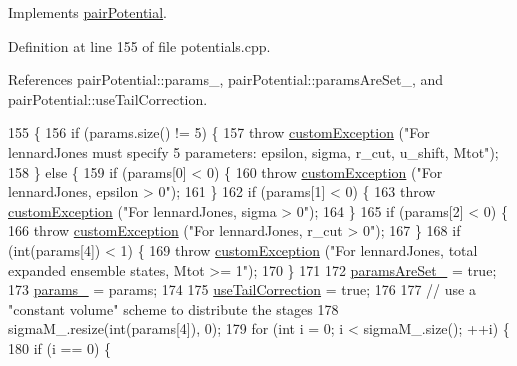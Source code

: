 Implements \hyperlink{classpair_potential_ad4b237646f9de2ae9f95cc9350564bc5}{pair\-Potential}.



Definition at line 155 of file potentials.\-cpp.



References pair\-Potential\-::params\-\_\-, pair\-Potential\-::params\-Are\-Set\-\_\-, and pair\-Potential\-::use\-Tail\-Correction.


\begin{DoxyCode}
155                                                                    \{
156     \textcolor{keywordflow}{if} (params.size() != 5) \{
157         \textcolor{keywordflow}{throw} \hyperlink{classcustom_exception}{customException} (\textcolor{stringliteral}{"For lennardJones must specify 5 parameters: epsilon, sigma,
       r\_cut, u\_shift, Mtot"});
158     \} \textcolor{keywordflow}{else} \{
159         \textcolor{keywordflow}{if} (params[0] < 0) \{
160             \textcolor{keywordflow}{throw} \hyperlink{classcustom_exception}{customException} (\textcolor{stringliteral}{"For lennardJones, epsilon > 0"});
161         \}
162         \textcolor{keywordflow}{if} (params[1] < 0) \{
163             \textcolor{keywordflow}{throw} \hyperlink{classcustom_exception}{customException} (\textcolor{stringliteral}{"For lennardJones, sigma > 0"});
164         \}
165         \textcolor{keywordflow}{if} (params[2] < 0) \{
166             \textcolor{keywordflow}{throw} \hyperlink{classcustom_exception}{customException} (\textcolor{stringliteral}{"For lennardJones, r\_cut > 0"});
167         \}
168         \textcolor{keywordflow}{if} (\textcolor{keywordtype}{int}(params[4]) < 1) \{
169             \textcolor{keywordflow}{throw} \hyperlink{classcustom_exception}{customException} (\textcolor{stringliteral}{"For lennardJones, total expanded ensemble states, Mtot
       >= 1"});
170         \}
171 
172         \hyperlink{classpair_potential_a635755c0a952bfc05a4cfae230c3dbd2}{paramsAreSet\_} = \textcolor{keyword}{true};
173         \hyperlink{classpair_potential_abf8ec8af983d6e9960bd149da099e883}{params\_} = params;
174 
175         \hyperlink{classpair_potential_ab4b4538a7e13771f50a29aaac2443037}{useTailCorrection} = \textcolor{keyword}{true};
176 
177         \textcolor{comment}{// use a "constant volume" scheme to distribute the stages}
178         sigmaM\_.resize(\textcolor{keywordtype}{int}(params[4]), 0);
179         \textcolor{keywordflow}{for} (\textcolor{keywordtype}{int} i = 0; i < sigmaM\_.size(); ++i) \{
180             \textcolor{keywordflow}{if} (i == 0) \{

\end{DoxyCode}

